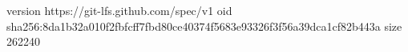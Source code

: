 version https://git-lfs.github.com/spec/v1
oid sha256:8da1b32a010f2fbfcff7fbd80ce40374f5683e93326f3f56a39dca1cf82b443a
size 262240
